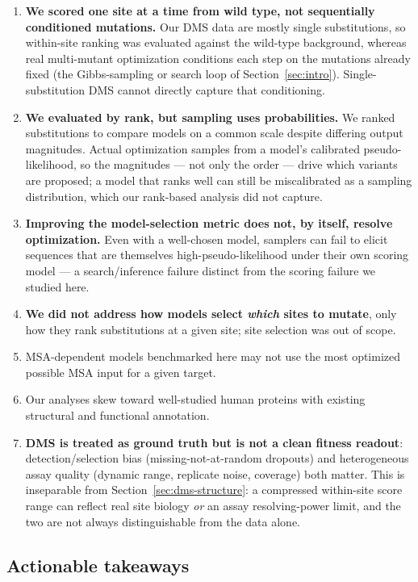 \documentclass{article}
\begin{document}
\begin{enumerate}
  \item \textbf{We scored one site at a time from wild type, not sequentially conditioned mutations.} Our DMS data are mostly single substitutions, so within-site ranking was evaluated against the wild-type background, whereas real multi-mutant optimization conditions each step on the mutations already fixed (the Gibbs-sampling or search loop of Section~\ref{sec:intro}). Single-substitution DMS cannot directly capture that conditioning.
  \item \textbf{We evaluated by rank, but sampling uses probabilities.} We ranked substitutions to compare models on a common scale despite differing output magnitudes. Actual optimization samples from a model's calibrated pseudo-likelihood, so the magnitudes --- not only the order --- drive which variants are proposed; a model that ranks well can still be miscalibrated as a sampling distribution, which our rank-based analysis did not capture.
  \item \textbf{Improving the model-selection metric does not, by itself, resolve optimization.} Even with a well-chosen model, samplers can fail to elicit sequences that are themselves high-pseudo-likelihood under their own scoring model --- a search/inference failure distinct from the scoring failure we studied here.
  \item \textbf{We did not address how models select \emph{which} sites to mutate}, only how they rank substitutions at a given site; site selection was out of scope.
  \item MSA-dependent models benchmarked here may not use the most optimized possible MSA input for a given target.
  \item Our analyses skew toward well-studied human proteins with existing structural and functional annotation.
  \item \textbf{DMS is treated as ground truth but is not a clean fitness readout}: detection/selection bias (missing-not-at-random dropouts) and heterogeneous assay quality (dynamic range, replicate noise, coverage) both matter. This is inseparable from Section~\ref{sec:dms-structure}: a compressed within-site score range can reflect real site biology \emph{or} an assay resolving-power limit, and the two are not always distinguishable from the data alone.
\end{enumerate}

\subsection{Actionable takeaways}
\end{document}
